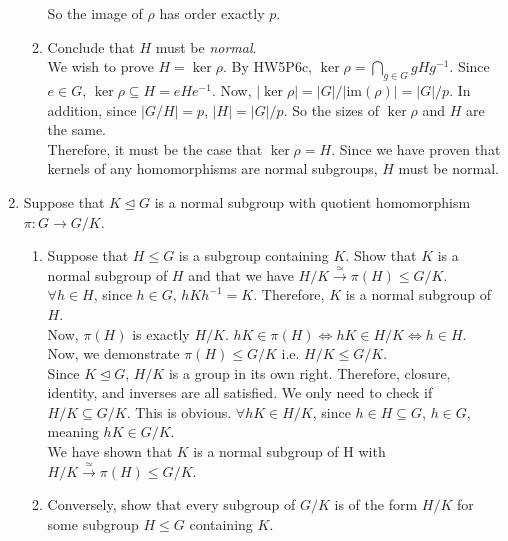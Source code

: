 \documentclass{amsart}
\begin{document}
\begin{enumerate}[itemsep=0.2in]
\begin{enumerate}
    So the image of $\rho$ has order exactly $p$.\\ 
    
	\item  Conclude that $H$ must be \emph{normal}.\\

    We wish to prove $H=\ker\rho$. By HW5P6c, $\ker \rho = \bigcap_{g\in G}gHg^{-1}$. Since $e\in G$, $\ker\rho\subseteq H=eHe^{-1}$. Now, $|\ker\rho|=|G|/|\mathrm{im}(\rho)|=|G|/p$. In addition, since $|G/H|=p$, $|H|=|G|/p$. So the sizes of $\ker\rho$ and $H$ are the same. \\
    
    Therefore, it must be the case that $\ker\rho=H$. Since we have proven that kernels of any homomorphisms are normal subgroups, $H$ must be normal.
\end{enumerate}



\item Suppose that $K\unlhd G$ is a normal subgroup with quotient homomorphism $\pi:G\to G/K$. 
\begin{enumerate}
	\item Suppose that $H\leq G$ is a subgroup containing $K$. Show that $K$ is a normal subgroup of $H$ and that we have $H/K \xrightarrow{\simeq}\pi(H)\leq G/K$.\\

    $\forall h\in H$, since $h\in G$, $hKh^{-1}=K$. Therefore, $K$ is a normal subgroup of $H$.\\

    Now, $\pi(H)$ is exactly $H/K$. $hK\in\pi(H)\iff hK\in H/K\iff h\in H$.\\

    Now, we demonstrate $\pi(H)\leq G/K$ i.e. $H/K\leq G/K$. \\

    Since $K\unlhd G$, $H/K$ is a group in its own right. Therefore, closure, identity, and inverses are all satisfied. We only need to check if $H/K\subseteq G/K$. This is obvious. $\forall hK\in H/K$, since $h\in H\subseteq G$, $h\in G$, meaning $hK\in G/K$. \\

    We have shown that $K$ is a normal subgroup of H with $H/K\xrightarrow{\simeq}\pi(H)\leq G/K$.\\

    
	\item Conversely, show that every subgroup of $G/K$ is of the form $H/K$ for some subgroup $H\leq G$ containing $K$.\\


\end{enumerate}
\end{enumerate}
\end{document}
